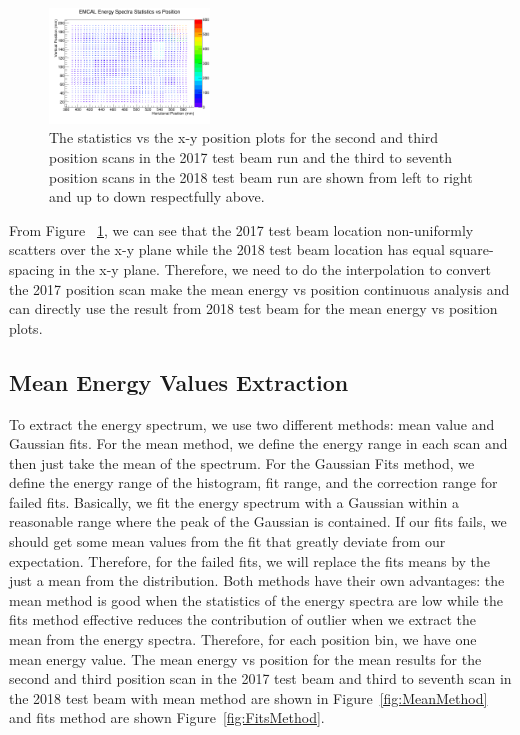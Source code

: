 \documentclass[hidelinks,11pt]{article}
\numberwithin{figure}{section}
\numberwithin{table}{section}
\begin{document}
\begin{figure}[hbtp]
\begin{center}
\includegraphics[width=0.38\textwidth]{Plots/StatPo/StatPo20187thScan.png}
\caption{The statistics vs the x-y position plots for the second and third position scans in the 2017 test beam run and the third to seventh position scans in the 2018 test beam run are shown from left to right and up to down respectfully above.}
\label{fig:Stats}
\end{center}
\end{figure} 

From Figure ~\ref{fig:Stats}, we can see that the 2017 test beam location non-uniformly scatters over the x-y plane while the 2018 test beam location has equal square-spacing in the x-y plane. Therefore, we need to do the interpolation to convert the 2017 position scan make the mean energy vs position continuous analysis and can directly use the result from 2018 test beam for the mean energy vs position plots.

\subsection{Mean Energy Values Extraction}

To extract the energy spectrum, we use two different methods: mean value and Gaussian fits. For the mean method, we define the energy range in each scan and then just take the mean of the spectrum. For the Gaussian Fits method, we define the energy range of the histogram, fit range, and the correction range for failed fits. Basically, we fit the energy spectrum with a Gaussian within a reasonable range where the peak of the Gaussian is contained. If our fits fails, we should get some mean values from the fit that greatly deviate from our expectation. Therefore, for the failed fits, we will replace the fits means by the just a mean from the distribution. Both methods have their own advantages: the mean method is good when the statistics of the energy spectra are low while the fits method effective reduces the contribution of outlier when we extract the mean from the energy spectra. Therefore, for each position bin, we have one mean energy value. The mean energy vs position for the mean results for the second and third position scan in the 2017 test beam and third to seventh scan in the 2018 test beam with mean method are shown in Figure~\ref{fig:MeanMethod} and fits method are shown Figure~\ref{fig:FitsMethod}. 
\end{document}
